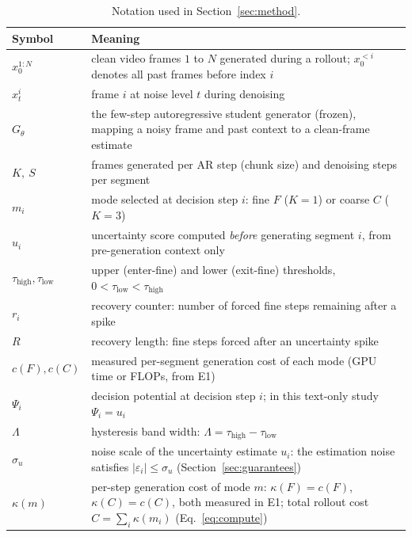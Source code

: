 \documentclass[11pt,a4paper]{article}
\begin{document}
\begin{table}[t]
\centering
\small
\renewcommand{\arraystretch}{1.35}
\begin{tabularx}{\textwidth}{>{\raggedright\arraybackslash}p{2.2cm} >{\raggedright\arraybackslash}X}
\toprule
\textbf{Symbol} & \textbf{Meaning} \\
\midrule
$x_0^{1:N}$ & clean video frames $1$ to $N$ generated during a rollout; $x_0^{<i}$ denotes all past frames before index $i$ \\
$x_t^i$ & frame $i$ at noise level $t$ during denoising \\
$G_\theta$ & the few-step autoregressive student generator (frozen), mapping a noisy frame and past context to a clean-frame estimate \\
$K,\ S$ & frames generated per AR step (chunk size) and denoising steps per segment \\
$m_i$ & mode selected at decision step $i$: fine $F$ ($K=1$) or coarse $C$ ($K=3$) \\
$u_i$ & uncertainty score computed \emph{before} generating segment $i$, from pre-generation context only \\
$\tau_{\mathrm{high}}, \tau_{\mathrm{low}}$ & upper (enter-fine) and lower (exit-fine) thresholds, $0<\tau_{\mathrm{low}}<\tau_{\mathrm{high}}$ \\
$r_i$ & recovery counter: number of forced fine steps remaining after a spike \\
$R$ & recovery length: fine steps forced after an uncertainty spike \\
$c(F), c(C)$ & measured per-segment generation cost of each mode (GPU time or FLOPs, from E1) \\
$\Psi_i$ & decision potential at decision step $i$; in this text-only study $\Psi_i=u_i$ \\
$\Lambda$ & hysteresis band width: $\Lambda = \tau_{\mathrm{high}} - \tau_{\mathrm{low}}$ \\
$\sigma_u$ & noise scale of the uncertainty estimate $u_i$: the estimation noise satisfies $|\varepsilon_i| \le \sigma_u$ (Section~\ref{sec:guarantees}) \\
$\kappa(m)$ & per-step generation cost of mode $m$: $\kappa(F) = c(F)$, $\kappa(C) = c(C)$, both measured in E1; total rollout cost $C = \sum_i \kappa(m_i)$ (Eq.~\eqref{eq:compute}) \\
\bottomrule
\end{tabularx}
\caption{Notation used in Section~\ref{sec:method}.}
\label{tab:notation}
\end{table}
\end{document}
